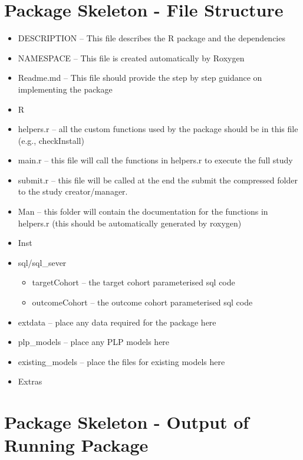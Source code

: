 \documentclass[
]{article}
\providecommand{\tightlist}{%
  \setlength{\itemsep}{0pt}\setlength{\parskip}{0pt}}
\begin{document}
\hypertarget{package-skeleton---file-structure}{%
\section{Package Skeleton - File
Structure}\label{package-skeleton---file-structure}}

\begin{itemize}
\tightlist
\item
  DESCRIPTION -- This file describes the R package and the dependencies
\item
  NAMESPACE -- This file is created automatically by Roxygen
\item
  Readme.md -- This file should provide the step by step guidance on
  implementing the package
\item
  R
\item
  helpers.r -- all the custom functions used by the package should be in
  this file (e.g., checkInstall)
\item
  main.r -- this file will call the functions in helpers.r to execute
  the full study
\item
  submit.r -- this file will be called at the end the submit the
  compressed folder to the study creator/manager.
\item
  Man -- this folder will contain the documentation for the functions in
  helpers.r (this should be automatically generated by roxygen)
\item
  Inst
\item
  sql/sql\_sever

  \begin{itemize}
  \tightlist
  \item
    targetCohort -- the target cohort parameterised sql code
  \item
    outcomeCohort -- the outcome cohort parameterised sql code
  \end{itemize}
\item
  extdata -- place any data required for the package here
\item
  plp\_models -- place any PLP models here
\item
  existing\_models -- place the files for existing models here
\item
  Extras
\end{itemize}

\hypertarget{package-skeleton---output-of-running-package}{%
\section{Package Skeleton - Output of Running
Package}\label{package-skeleton---output-of-running-package}}
\end{document}
